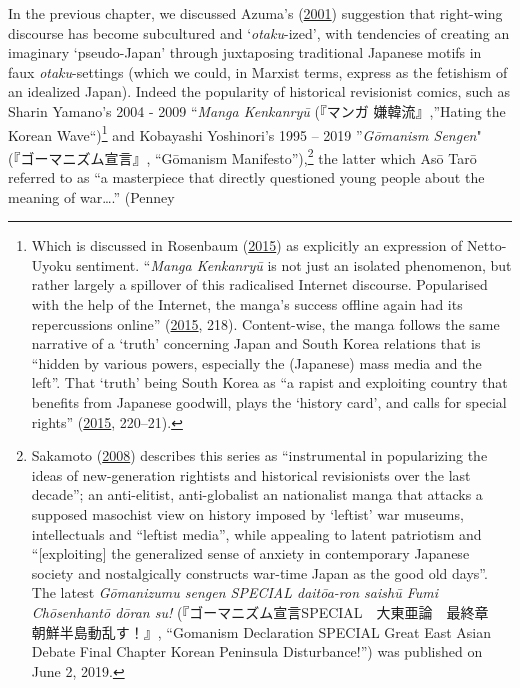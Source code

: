 \documentclass[10pt,british,A4paper,twoside]{memoir}
\begin{document}
In the previous chapter, we discussed Azuma's
(\protect\hyperlink{ref-azuma_otaku:_2001}{2001}) suggestion that
right-wing discourse has become subcultured and `\emph{otaku}-ized',
with tendencies of creating an imaginary `pseudo-Japan' through
juxtaposing traditional Japanese motifs in faux \emph{otaku}-settings
(which we could, in Marxist terms, express as the fetishism of an
idealized Japan). Indeed the popularity of historical revisionist
comics, such as Sharin Yamano's 2004 - 2009 ``\emph{Manga Kenkanryū}
(『マンガ 嫌韓流』,''Hating the Korean Wave``)\footnote{Which is
  discussed in Rosenbaum
  (\protect\hyperlink{ref-rosenbaum_manga_2015}{2015}) as explicitly an
  expression of Netto-Uyoku sentiment. ``\emph{Manga Kenkanryū} is not
  just an isolated phenomenon, but rather largely a spillover of this
  radicalised Internet discourse. Popularised with the help of the
  Internet, the manga's success offline again had its repercussions
  online'' (\protect\hyperlink{ref-rosenbaum_manga_2015}{2015}, 218).
  Content-wise, the manga follows the same narrative of a `truth'
  concerning Japan and South Korea relations that is ``hidden by various
  powers, especially the (Japanese) mass media and the left''. That
  `truth' being South Korea as ``a rapist and exploiting country that
  benefits from Japanese goodwill, plays the `history card', and calls
  for special rights''
  (\protect\hyperlink{ref-rosenbaum_manga_2015}{2015}, 220--21).} and
Kobayashi Yoshinori's 1995 -- 2019 ''\emph{Gōmanism Sengen}"
(『ゴーマニズム宣言』, ``Gōmanism Manifesto''),\footnote{Sakamoto
  (\protect\hyperlink{ref-sakamoto_will_2008}{2008}) describes this
  series as ``instrumental in popularizing the ideas of new-generation
  rightists and historical revisionists over the last decade''; an
  anti-elitist, anti-globalist an nationalist manga that attacks a
  supposed masochist view on history imposed by `leftist' war museums,
  intellectuals and ``leftist media'', while appealing to latent
  patriotism and ``{[}exploiting{]} the generalized sense of anxiety in
  contemporary Japanese society and nostalgically constructs war-time
  Japan as the good old days''. The latest \emph{Gōmanizumu sengen
  SPECIAL daitōa-ron saishū Fumi Chōsenhantō dōran su!}
  (『ゴーマニズム宣言SPECIAL　大東亜論　最終章　朝鮮半島動乱す！』,
  ``Gomanism Declaration SPECIAL Great East Asian Debate Final Chapter
  Korean Peninsula Disturbance!'') was published on June 2, 2019.} the
latter which Asō Tarō referred to as ``a masterpiece that directly
questioned young people about the meaning of war\ldots{}.'' (Penney
\end{document}
